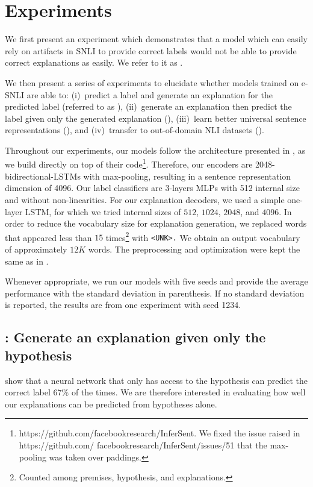 \section{Experiments}
We first present an experiment which demonstrates that a model which can easily rely on artifacts in SNLI to provide correct labels would not be able to provide correct explanations as easily. We refer to it as \expzero.

We then present a series of experiments to elucidate whether models trained on e-SNLI are able to: (i)~predict a label and generate an explanation for the predicted label (referred to as \expone), (ii)~generate an explanation then predict the label given only the generated explanation (\exptwo), (iii)~learn better universal sentence representations (\expthree), and  (iv)~transfer to out-of-domain NLI datasets (\expfour).

Throughout our experiments, our models follow the architecture presented in \citet{infersent}, as we build directly on top of their code\footnote{https://github.com/facebookresearch/InferSent. We fixed the issue raised in https://github.com/ facebookresearch/InferSent/issues/51 that the max-pooling was taken over paddings.}. Therefore, our encoders are 2048-bidirectional-LSTMs \cite{lstm} with max-pooling, resulting in a sentence representation dimension of 4096. Our label classifiers are 3-layers MLPs with 512 internal size and without non-linearities. For our explanation decoders, we used a simple one-layer LSTM, for which we tried internal sizes of $512$, $1024$, $2048$, and $4096$.
In order to reduce the vocabulary size for explanation generation, we replaced words that appeared less than $15$ times\footnote{Counted among premises, hypothesis, and explanations.} with {\tt <UNK>.}
We obtain an output vocabulary of approximately $12K$ words. 
The preprocessing and optimization were kept the same as in \cite{infersent}. 

Whenever appropriate, we run our models with five seeds and provide the average performance with the standard deviation in parenthesis. If no standard deviation is reported, the results are from one experiment with seed 1234. 

\subsection{\expzero: Generate an explanation given only the hypothesis}
\label{expzero}

\citet{artifacts} show that a neural network that only has access to the hypothesis can predict the correct label $67\%$ of the times. We are therefore interested in evaluating how well our explanations can be predicted from hypotheses alone.


